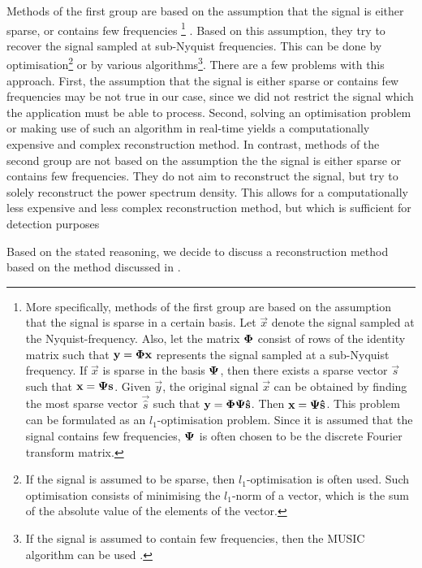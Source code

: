 \documentclass[a4paper, openany, oneside]{memoir}
\begin{document}
Methods of the first group are based on the assumption that the signal is either sparse, or contains few frequencies%
\footnote{More specifically, methods of the first group are based on the assumption that the signal is sparse in a certain basis. Let $\vec{x}$ denote the signal sampled at the Nyquist-frequency. Also, let the matrix $\boldsymbol{\mathbf{\Phi}}$ consist of rows of the identity matrix such that $\boldsymbol{\mathbf{y}}=\boldsymbol{\mathbf{\Phi}}\boldsymbol{\mathbf{x}}$ represents the signal sampled at a sub-Nyquist frequency. If $\vec{x}$ is sparse in the basis $\boldsymbol{\mathbf{\Psi}}$, then there exists a sparse vector $\vec{s}$ such that $\boldsymbol{\mathbf{x}}=\boldsymbol{\mathbf{\Psi}}\boldsymbol{\mathbf{s}}$. Given $\vec{y}$, the original signal $\vec{x}$ can be obtained by finding the most sparse vector $\vec{\hat{s}}$ such that $\boldsymbol{\mathbf{y}}=\boldsymbol{\mathbf{\Phi}}\boldsymbol{\mathbf{\Psi}}\boldsymbol{\mathbf{\hat{s}}}$. Then $\boldsymbol{\mathbf{x}} = \boldsymbol{\mathbf{\Psi}}\boldsymbol{\mathbf{\hat{s}}}$. This problem can be formulated as an $l_1$-optimisation problem. Since it is assumed that the signal contains few frequencies, $\boldsymbol{\mathbf{\Psi}}$ is often chosen to be the discrete Fourier transform matrix.}%
. Based on this assumption, they try to recover the signal sampled at sub-Nyquist frequencies. This can be done by optimisation\footnote{If the signal is assumed to be sparse, then $l_1$-optimisation is often used. Such optimisation consists of minimising the $l_1$-norm of a vector, which is the sum of the absolute value of the elements of the vector.} or by various algorithms\footnote{If the signal is assumed to contain few frequencies, then the MUSIC algorithm can be used \cite{pal2011coprime}.}. There are a few problems with this approach. First, the assumption that the signal is either sparse or contains few frequencies may be not true in our case, since we did not restrict the signal which the application must be able to process. Second, solving an optimisation problem or making use of such an algorithm in real-time yields a computationally expensive and complex reconstruction method. In contrast, methods of the second group are not based on the assumption the the signal is either sparse or contains few frequencies. They do not aim to reconstruct the signal, but try to solely reconstruct the power spectrum density. This allows for a computationally less expensive and less complex reconstruction method, but which is sufficient for detection purposes

Based on the stated reasoning, we decide to discuss a reconstruction method based on the method discussed in \cite{ariananda2012compressive}.
\end{document}
